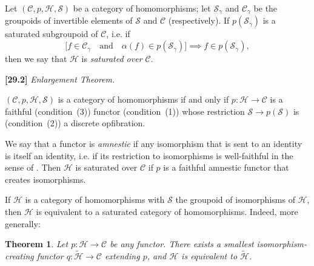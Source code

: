 \documentclass[a4paper,fleqn]{article}
\theoremstyle{plain}
\newtheorem*{theorem*}{Theorem}
\theoremstyle{definition}
\newenvironment{longcomm}[1]
  {\noindent\textbf{[#1]}\rmfamily}
  {}
\newcommand{\textand}{\quad\text{and}\quad}
\newcommand{\CC}{\mathcal{C}}
\newcommand{\HH}{\mathcal{H}}
\renewcommand{\SS}{\mathcal{S}}
\begin{document}
Let $(\CC,p,\HH,\SS)$ be a category of homomorphisms;
let $\SS_\gamma$ and $\CC_\gamma$ be the groupoids of invertible elements of $\SS$ and $\CC$ (respectively).
If $p(\SS_\gamma)$ is a saturated \cite{3a} subgroupoid of $\CC$, i.e. if
\[
  \big[f\in\CC_\gamma
  \textand
  \alpha(f)\in p(\SS_\gamma)\big]
  \implies
  f\in p(\SS_\gamma),
\]
then we say that $\HH$ is \emph{saturated over $\CC$}.

\begin{longcomm}{29.2}
  \emph{Enlargement Theorem.}

  $(\CC,p,\HH,\SS)$ is a category of homomorphisms if and only if $p\colon\HH\to\CC$ is a faithful (condition~(3)) functor (condition~(1)) whose restriction $\SS\to p(\SS)$ is (condition~(2)) a discrete opfibration.

  We say that a functor is \emph{amnestic} if any isomorphism that is sent to an identity is itself an identity, i.e. if its restriction to isomorphisms is well-faithful in the sense of \cite{coll77,coll122}.
  Then $\HH$ is saturated over $\CC$ if $p$ is a faithful amnestic functor that creates isomorphisms.

  If $\HH$ is a category of homomorphisms with $\SS$ the groupoid of isomorphisms of $\HH$, then $\HH$ is equivalent to a saturated category of homomorphisms.
  Indeed, more generally:

  \begin{theorem*}
    Let $p\colon\HH\to\CC$ be any functor.
    There exists a smallest isomorphism-creating functor $q\colon\widetilde{\HH}\to\CC$ extending $p$, and $\HH$ is equivalent to $\widetilde{\HH}$.
  \end{theorem*}


\end{longcomm}
\end{document}
